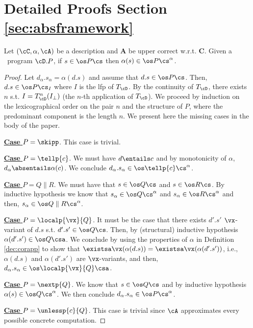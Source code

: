 \documentclass{tlp}
\begin{document}
\section{Detailed Proofs Section \ref{sec:absframework}} \label{app-sec-abs}
{
Let $(\cC, \alpha, \cA )$  be a description and   ${\mathbf{A}}$  be upper correct w.r.t. $\mathbf{C}$.   Given a  \utcc\ program $\cD.P$, if 
$ s \in \os P \cs $ then  $\alpha(s) \in \os P \cs^{\alpha}$.  
}
\begin{proof} 
Let $d_{\alpha}.s_{\alpha} = \alpha(d.s)$ and assume that $d.s \in  \os P \cs$. Then, $d.s \in \os P\cs_I$ where $I$ is the lfp of $T_{\cD}$. By the continuity of $T_{\cD}$,  there exists $n$ s.t.  $I = T_{\cD}^n(I_\bot)$ (the $n$-th application of $T_{\cD}$). 
We proceed by  induction on the lexicographical order on 
the pair $n$ and the structure of $P$, where the predominant component is the length $n$. We present here the missing cases in the body of the paper. 

\noindent \underline{{\bf Case}  $P=\skipp$}. This case is trivial.


\noindent \underline{{\bf Case}   $P=\tellp{c}$}. We must have $d\entails c$ and by monotonicity of $\alpha$,  $d_{\alpha} \absentails \alpha(c)$. We conclude  $d_{\alpha}.s_{\alpha} \in \os \tellp{c}  \cs^\alpha$.


\noindent \underline{{\bf Case}   $P = Q \parallel R$}. We must have that $s\in \os Q\cs$
	and $s\in \os R \cs$.  By inductive hypothesis we know that
	$s_{\alpha} \in \os Q\cs^\alpha$ and
	$s_{\alpha} \in \os R\cs^\alpha$ and then,
	$s_{\alpha} \in \os Q \parallel R \cs^\alpha$.



\noindent \underline{{\bf Case}   $P=\localp{\vx}{Q}$}. It must be the case that there exists $d'.s'$ $\vx$-variant of $d.s$ s.t.
		$d'.s' \in \os Q \cs$. Then,  by (structural) inductive hypothesis $\alpha(d'.s') \in \os Q\csa$. We conclude by using the properties of $\alpha$ in Definition \ref{dec:corapp} to show that $\existsa \vx(\alpha(d.s)) = \existsa \vx(\alpha(d'.s'))$, i.e., $\alpha(d.s)$ and $\alpha(d'.s')$ are $\vx$-variants, and then, $d_\alpha.s_\alpha \in \os \localp{\vx}{Q} \csa$. 


\noindent \underline{{\bf Case}   $P=\nextp{Q}$}. 
	We know that $s \in \os Q\cs$ and by inductive hypothesis
	$\alpha(s) \in \os Q\cs^\alpha$. We then conclude $d_{\alpha}.s_{\alpha} \in \os P \cs^\alpha$. 
	
\noindent \underline{{\bf Case}   $P=\unlessp{c}{Q}$}. This case is trivial since $\cA$ approximates every possible concrete computation.
\end{proof}
\end{document}
